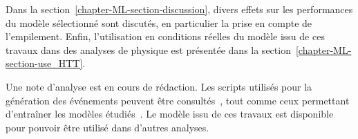 Dans la section~\ref{chapter-ML-section-discussion},
divers effets sur les performances du modèle sélectionné sont discutés,
en particulier la prise en compte de l'empilement.
Enfin, l'utilisation en conditions réelles du modèle issu de ces travaux dans des analyses de physique est présentée dans la section~\ref{chapter-ML-section-use_HTT}.
\par
Une note d'analyse \cite{CMS-NOTE-2021-054} est en cours de rédaction.
Les scripts utilisés pour la génération des événements peuvent être consultés~\cite{fastsim_ece},
tout comme ceux permettant d'entraîner les modèles étudiés~\cite{DL_for_HTT_mass}.
Le modèle issu de ces travaux est disponible~\cite{DiTau_ML_mass} pour pouvoir être utilisé dans d'autres analyses.